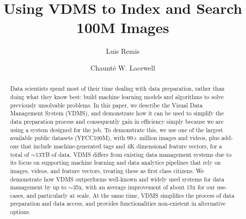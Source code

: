 \documentclass[sigconf, nonacm]{acmart}
\begin{document}
\title{Using VDMS to Index and Search 100M Images}

\author{Luis Remis}

\author{Chaunt\'e W. Lacewell}

\begin{abstract}
Data scientists spend most of their time dealing with data preparation,
rather than doing what they know best:
build machine learning models and algorithms to solve previously unsolvable problems.
In this paper, we describe the Visual Data Management System (VDMS),
and demonstrate how it can be used to simplify the data preparation process
and consequently gain in efficiency simply because
we are using a system designed for the job.
To demonstrate this, we use one of the largest available
public datasets (YFCC100M),
with 99+ million images and videos, plus add-ons that include
machine-generated tags and 4K dimensional feature vectors,
for a total of $\sim$13TB of data.
VDMS differs from existing data management systems
due to its focus on supporting machine learning and
data analytics pipelines that rely on images, videos, and feature vectors,
treating these as first class citizens.
We demonstrate how VDMS outperforms well-known and widely used
systems for data management by up to $\sim$35x, with
an average improvement of about 15x for our use-cases, and particularly at scale.
At the same time, VDMS simplifies the process of data preparation and data access,
and provides functionalities non-existent in alternative options.
\end{abstract}

\maketitle
\end{document}
